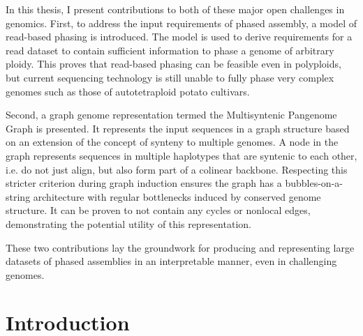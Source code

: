 \documentclass[12pt, twoside, a4paper]{report}
\begin{document}
In this thesis, I present contributions to both of these major open challenges in genomics.
First, to address the input requirements of phased assembly, a model of read-based phasing is introduced.
The model is used to derive requirements for a read dataset to contain sufficient information to phase a genome of arbitrary ploidy.
This proves that read-based phasing can be feasible even in polyploids, but current sequencing technology is still unable to fully phase very complex genomes such as those of autotetraploid potato cultivars.

Second, a graph genome representation termed the Multisyntenic Pangenome Graph is presented.
It represents the input sequences in a graph structure based on an extension of the concept of synteny to multiple genomes.
A node in the graph represents sequences in multiple haplotypes that are syntenic to each other, i.e\@. do not just align, but also form part of a colinear backbone. %
Respecting this stricter criterion during graph induction ensures the graph has a bubbles-on-a-string architecture with regular bottlenecks induced by conserved genome structure.
It can be proven to not contain any cycles or nonlocal edges, demonstrating the potential utility of this representation.

These two contributions lay the groundwork for producing and representing large datasets of phased assemblies in an interpretable manner, even in challenging genomes.


%


\pagestyle{fancy}
\fancyhead{}
\fancyhead[C]{\thetitle}
\fancyfoot{} %
\fancyfoot[LE,RO]{\thepage}


\chapter*{Introduction}

\newpage
\end{document}

